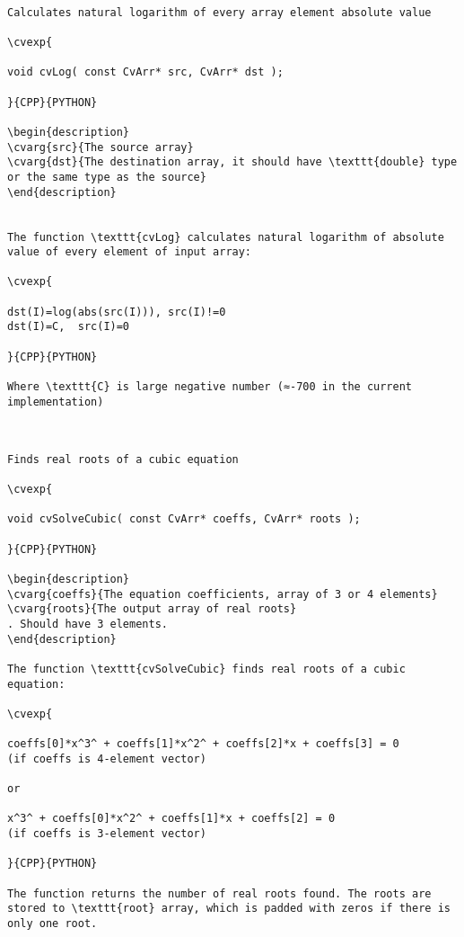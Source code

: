 \begin{verbatim}

Calculates natural logarithm of every array element absolute value

\cvexp{

void cvLog( const CvArr* src, CvArr* dst );

}{CPP}{PYTHON}

\begin{description}
\cvarg{src}{The source array}
\cvarg{dst}{The destination array, it should have \texttt{double} type or the same type as the source}
\end{description}


The function \texttt{cvLog} calculates natural logarithm of absolute value of every element of input array:

\cvexp{

dst(I)=log(abs(src(I))), src(I)!=0
dst(I)=C,  src(I)=0

}{CPP}{PYTHON}

Where \texttt{C} is large negative number (≈-700 in the current implementation)


\end{verbatim}
\begin{verbatim}

Finds real roots of a cubic equation

\cvexp{

void cvSolveCubic( const CvArr* coeffs, CvArr* roots );

}{CPP}{PYTHON}

\begin{description}
\cvarg{coeffs}{The equation coefficients, array of 3 or 4 elements}
\cvarg{roots}{The output array of real roots}
. Should have 3 elements.
\end{description}

The function \texttt{cvSolveCubic} finds real roots of a cubic equation:

\cvexp{

coeffs[0]*x^3^ + coeffs[1]*x^2^ + coeffs[2]*x + coeffs[3] = 0
(if coeffs is 4-element vector)

or

x^3^ + coeffs[0]*x^2^ + coeffs[1]*x + coeffs[2] = 0
(if coeffs is 3-element vector)

}{CPP}{PYTHON}

The function returns the number of real roots found. The roots are stored to \texttt{root} array, which is padded with zeros if there is only one root.


\end{verbatim}
